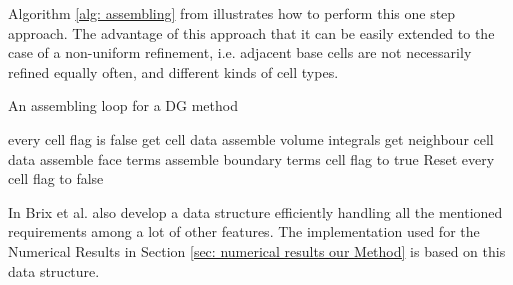 Algorithm \ref{alg: assembling} from \cite{BMV2009} illustrates how to perform this one step approach. 
The advantage of this approach that it can be easily extended to the case of a non-uniform refinement, i.e. adjacent base cells are not necessarily refined equally often, and different kinds of cell types.

\begin{algorithm}[h]
\caption{An assembling loop for a DG method}
\label{alg: assembling}
\begin{algorithmic}
\Ensure every cell flag is false
\State get cell data
\State assemble volume integrals 
					\State get neighbour cell data
					\State assemble face terms
			\EndIf
		\Else
			\State assemble boundary terms
		\EndIf
\EndFor
	\State cell flag to true 
\EndFor
\State Reset every cell flag to false
\end{algorithmic}
\end{algorithm}

In \cite{BMV2009} Brix et al. also develop a data structure efficiently handling all the mentioned requirements among a lot of other features. The implementation used for the Numerical Results in Section \ref{sec: numerical results our Method} is based on this data structure.
